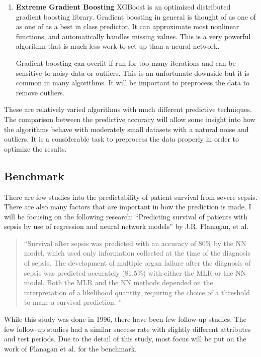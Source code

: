 \documentclass[11pt]{article}
\begin{document}
\begin{enumerate}
	\item \textbf{Extreme Gradient Boosting} XGBoost is an optimized distributed gradient boosting library. Gradient boosting in general is thought of as one of as one of as a best in class predictor. It can approximate most nonlinear functions, and automatically handles missing values. This is a very powerful algorithm that is much less work to set up than a neural network.
	
	Gradient boosting can overfit if run for too many iterations and can be sensitive to noisy data or outliers. This is an unfortunate downside but it is common in many algorithms. It will be important to preprocess the data to remove outliers.
\end{enumerate}

These are relatively varied algorithms with much different predictive techniques. The comparison between the predictive accuracy will allow some insight into how the algorithms behave with moderately small datasets with a natural noise and outliers. It is a considerable task to preprocess the data properly in order to optimize the results.

\subsection{Benchmark}
There are few studies into the predictability of patient survival from severe sepsis. There are also many factors that are important in how the prediction is made. I will be focusing on the following research: ``Predicting survival of patients with sepsis by use of regression and neural network models'' by J.R. Flanagan, et al. 
\begin{quotation}
	``Survival after sepsis was predicted with an accuracy of 80\% by the NN model, which used only information collected at the time of the diagnosis of sepsis. The development of multiple organ failure after the diagnosis of sepsis was predicted accurately (81.5\%) with either the MLR or the NN model. Both the MLR and the NN methods depended on the interpretation of a likelihood quantity, requiring the choice of a threshold to make a survival prediction. ''\cite{sepsisresearch}
\end{quotation}

While this study was done in 1996, there have been few follow-up studies. The few follow-up studies had a similar success rate with slightly different attributes and test periods. Due to the detail of this study, most focus will be put on the work of Flanagan et al. for the benchmark.
\end{document}
